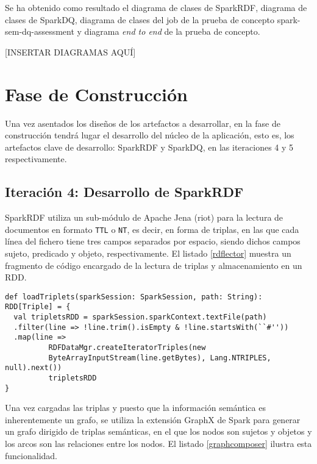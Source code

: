 Se ha obtenido como resultado el diagrama de clases de SparkRDF, diagrama de clases
de SparkDQ, diagrama de clases del job de la prueba de concepto 
spark-sem-dq-assessment y diagrama \textit{end to end} de la prueba de
concepto.

[INSERTAR DIAGRAMAS AQUÍ]


\section{Fase de Construcción}

Una vez asentados los diseños de los artefactos a desarrollar, en la fase de
construcción tendrá lugar el desarrollo del núcleo de la aplicación, esto es,
los artefactos clave de desarrollo: SparkRDF y SparkDQ, en las iteraciones 4 y 5
respectivamente. 

\subsection{Iteración 4: Desarrollo de SparkRDF}



SparkRDF utiliza un sub-módulo de Apache Jena (riot) para la lectura de
documentos en formato \texttt{TTL} o \texttt{NT}, es decir, en forma de triplas, en las que cada línea
del fichero tiene tres campos separados por espacio, siendo dichos campos sujeto,
predicado y objeto, respectivamente. El listado \ref{rdflector} muestra un
fragmento de código encargado de la lectura de triplas y almacenamiento en un
RDD. 

\lstset{escapechar=@,language=scala}
\begin{lstlisting}[caption={Fragmento del lector de triplas},captionpos=b, label=rdflector]
def loadTriplets(sparkSession: SparkSession, path: String): RDD[Triple] = {
  val tripletsRDD = sparkSession.sparkContext.textFile(path)
  .filter(line => !line.trim().isEmpty & !line.startsWith(``#''))
  .map(line =>
          RDFDataMgr.createIteratorTriples(new
          ByteArrayInputStream(line.getBytes), Lang.NTRIPLES, null).next())
          tripletsRDD
}  
\end{lstlisting}

Una vez cargadas las triplas y puesto que la información semántica es
inherentemente un grafo, se utiliza la extensión GraphX de Spark para generar un
grafo dirigido de triplas semánticas, en el que los nodos son sujetos y objetos y los
arcos son las relaciones entre los nodos. El listado \ref{graphcomposer} ilustra
esta funcionalidad. 

